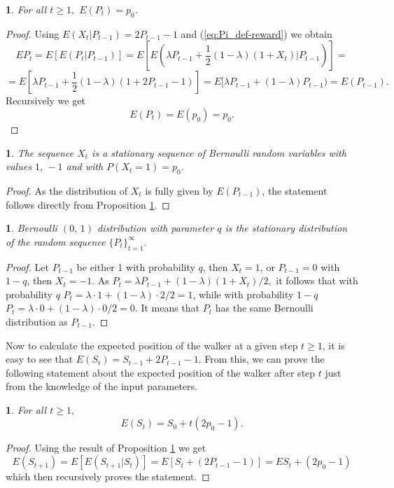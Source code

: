 \documentclass{amsart}
\theoremstyle{definition}
\theoremstyle{plain}
\newtheorem{prop}[thm]{\protect\propositionname}
\theoremstyle{plain}
\theoremstyle{plain}
\numberwithin{equation}{section}
\providecommand{\propositionname}{Proposition}
\begin{document}
\begin{prop}
\label{PropReward2}For all $t\geq1,$ $E(P_{t})=p_{0}.$
\end{prop}
\begin{proof}
Using $E(X_{t}|P_{t-1})=2P_{t-1}-1$ and (\ref{eq:Pi_def-reward})
we obtain
\[
EP_{t}=E[E(P_{t}|P_{t-1})]=E[E(\lambda P_{t-1}+\frac{1}{2}(1-\lambda)(1+X_{t})|P_{t-1})]=
\]
\[
=E[\lambda P_{t-1}+\frac{1}{2}(1-\lambda)(1+2P_{t-1}-1)]=E[\lambda P_{t-1}+(1-\lambda)P_{t-1})=  E(P_{t-1}).
\]
Recursively we get
\begin{equation}
E(P_{t})=E(p_{0})=p_{0}.\label{eq:EPt-reward-formula}
\end{equation}
\end{proof}

\begin{prop}
The sequence $X_t$ is a stationary sequence of Bernoulli random
variables with values $1,\,-1$ and with $P(X_t=1)=p_0$.
\end{prop}
\begin{proof}
As the distribution of $X_t$ is fully given by $E(P_{t-1})$, the
statement follows directly from Proposition \ref{PropReward2}.
\end{proof}

\begin{prop}
Bernoulli $(0,\,1)$ distribution with parameter $q$ is the stationary distribution of the random sequence
${\{P_{t}\}}_{t=1}^{\infty}$.
\end{prop}
\begin{proof}
Let $P_{t-1}$ be either 1 with probability $q$, then $X_t=1$, or
$P_{t-1}=0$ with $1-q$, then $X_t=-1$.  As $P_t=\lambda
P_{t-1}+(1-\lambda)(1+X_t)/2,$ it follows that with probability
$q$ $P_t=\lambda\cdot 1+(1-\lambda)\cdot 2/2=1$, while with
probability $1-q$ $P_t=\lambda\cdot 0+(1-\lambda)\cdot 0/2=0$.
It means that $P_t$ has the same Bernoulli distribution as
$P_{t-1}$.
\end{proof}

Now to calculate the expected position of the walker at a given
step $t\geq1$, it is easy to see that
$E(S_{t})=S_{t-1}+2P_{t-1}-1$. From this, we can prove the
following statement about the expected position of the walker
after step $t$ just from the knowledge of the input parameters.

\begin{prop}
For all $t\geq1,$
\[
E(S_{t})=S_{0}+t(2p_{0}-1).
\]
\end{prop}
\begin{proof}
Using the result of Proposition \ref{PropReward2} we get
\[
E(S_{t+1})=E[E(S_{t+1}|S_{t})]=E[S_{t}+(2P_{t-1}-1)]=
ES_{t}+(2p_{0}-1)
\]
which then recursively proves the statement.
\end{proof}
\end{document}
